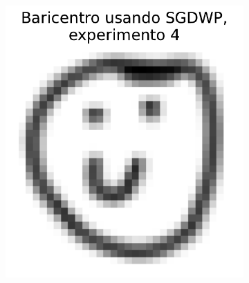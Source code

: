 \begin{figure}[H]
\begin{subfigure}[b]{0.17\textwidth}
        \label{fig:bar-SGDWP-exp-03}
    \end{subfigure}
    \hfill
    \begin{subfigure}[b]{0.17\textwidth}
        \centering
        \includegraphics[width=\textwidth]{img/sgdwp/bar-SGDWP-exp-04.pdf}
        \label{fig:bar-SGDWP-exp-04}
    \end{subfigure}
    \hfill
    \begin{subfigure}[b]{0.17\textwidth}
        \centering

\end{subfigure}
\end{figure}
